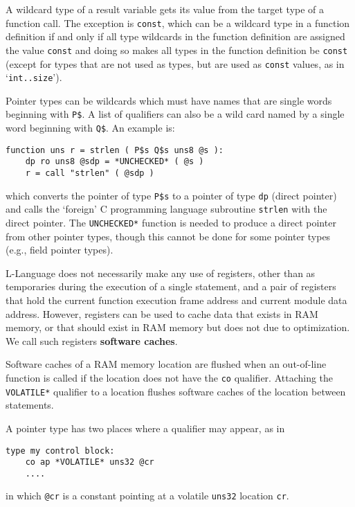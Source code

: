 \documentclass[12pt]{article}
\newcommand{\skey}[2]{{\rm \bfseries #1#2}}
\newenvironment{indpar}[1][0.3in]%
	{\begin{list}{}%
		     {\setlength{\itemsep}{0in}%
		      \setlength{\topsep}{0in}%
		      \setlength{\parsep}{1ex}%
		      \setlength{\labelwidth}{#1}%
		      \setlength{\leftmargin}{#1}%
		      \addtolength{\leftmargin}{\labelsep}}%
	 \item}%
	{\end{list}}
\begin{document}
A wildcard type of a result variable gets its value from the
target type of a function call.  The exception
is {\tt const}, which can be a wildcard type in a function
definition if and only if all type wildcards in the function definition
are assigned the value {\tt const} and doing so makes
all types in the function definition be {\tt const}
(except for types that are not used as types, but are used as
{\tt const} values, as in `{\tt int..size}').

Pointer types can be wildcards which must have names that are
single words beginning with {\tt P\$}.  A list of qualifiers
can also be a wild card named by a single word beginning with
{\tt Q\$}.  An example is:

\begin{indpar}\begin{verbatim}
function uns r = strlen ( P$s Q$s uns8 @s ):
    dp ro uns8 @sdp = *UNCHECKED* ( @s )
    r = call "strlen" ( @sdp )
\end{verbatim}\end{indpar}

which converts the pointer of type {\tt P\$s} to a pointer of
type {\tt dp} (direct pointer) and calls the `foreign' C programming
language subroutine {\tt strlen} with the direct pointer.
The {\tt *UNCHECKED*} function is needed to produce a direct pointer
from other pointer types, though this cannot be done for some pointer types
(e.g., field pointer types).

L-Language does not necessarily make any use of registers, other
than as temporaries during the execution of a single statement,
and a pair of registers that hold the current function
execution frame address and current module data address.
However, registers can be used to cache data that exists in
RAM memory, or that should exist in RAM memory but does not
due to optimization.  We call such registers
\skey{software cach}{es}.

Software caches of a RAM memory location are flushed when an out-of-line
function is called if the location does not have the {\tt co} qualifier.
Attaching the {\tt *VOLATILE*} qualifier to a location
flushes software caches of the location between statements.

A pointer type
has two places where a qualifier may appear, as in

\begin{indpar}\begin{verbatim}
type my control block:
    co ap *VOLATILE* uns32 @cr
    ....
\end{verbatim}\end{indpar}
in which {\tt @cr} is a constant pointing at a volatile
{\tt uns32} location {\tt cr}.
\end{document}
